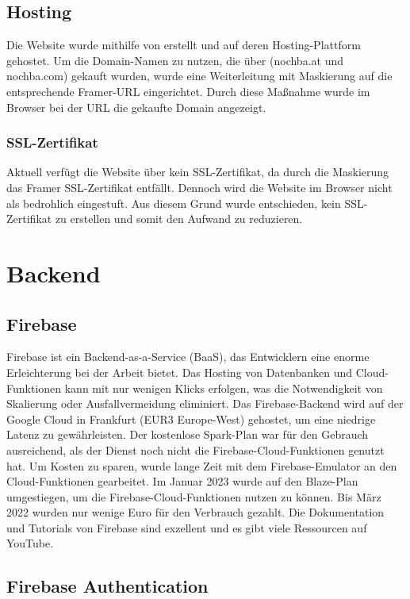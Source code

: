 \subsection{Hosting}
Die Website wurde mithilfe von \cite{framer} erstellt und auf deren
Hosting-Plattform gehostet. Um die Domain-Namen zu nutzen,
die über \cite{godaddy} (nochba.at und nochba.com) gekauft wurden, wurde eine Weiterleitung
mit Maskierung auf die entsprechende Framer-URL
eingerichtet. Durch diese Maßnahme wurde im Browser bei der
URL die gekaufte Domain angezeigt.


\subsubsection{SSL-Zertifikat}
Aktuell verfügt die Website über kein SSL-Zertifikat, da durch die Maskierung das Framer SSL-Zertifikat entfällt. Dennoch wird die Website im Browser nicht als bedrohlich eingestuft. Aus diesem Grund wurde entschieden, kein SSL-Zertifikat zu erstellen und somit den Aufwand zu reduzieren.

\section{Backend}


\subsection{Firebase}
Firebase ist ein Backend-as-a-Service (BaaS), das Entwicklern eine enorme Erleichterung bei der Arbeit bietet. Das Hosting von Datenbanken und Cloud-Funktionen kann mit nur wenigen Klicks erfolgen, was die Notwendigkeit von Skalierung oder Ausfallvermeidung eliminiert. Das Firebase-Backend wird auf der Google Cloud in Frankfurt (EUR3 Europe-West) gehostet, um eine niedrige Latenz zu gewährleisten. Der kostenlose Spark-Plan war für den Gebrauch ausreichend, als der Dienst noch nicht die Firebase-Cloud-Funktionen genutzt hat. Um Kosten zu sparen, wurde lange Zeit mit dem Firebase-Emulator an den Cloud-Funktionen gearbeitet. Im Januar 2023 wurde auf den Blaze-Plan umgestiegen, um die Firebase-Cloud-Funktionen nutzen zu können. Bis März 2022 wurden nur wenige Euro für den Verbrauch gezahlt. Die Dokumentation und Tutorials von Firebase sind exzellent und es gibt viele Ressourcen auf YouTube.

\subsection{Firebase Authentication}

